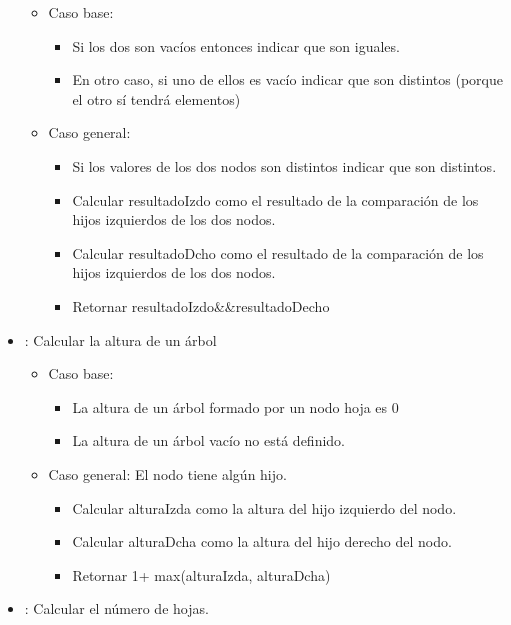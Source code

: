 \begin{itemize}
\begin{itemize}
\item Caso base: 
	\begin{itemize}
	\item Si los dos son vacíos entonces indicar que son iguales. 
	\item En otro caso, si uno de ellos es vacío indicar que son distintos (porque el otro sí tendrá elementos)
	\end{itemize}
\item Caso general: 
	\begin{itemize}
	\item Si los valores de los dos nodos son distintos indicar que son distintos.
	\item Calcular resultadoIzdo como el resultado de la comparación de los hijos izquierdos de los dos nodos.
	\item Calcular resultadoDcho como el resultado de la comparación de los hijos izquierdos de los dos nodos.
	\item Retornar resultadoIzdo\&\&resultadoDecho
	\end{itemize}
\end{itemize}


\item {}:   Calcular la altura de un árbol

\begin{itemize}
\item Caso base: 
	\begin{itemize}
	\item La altura de un árbol formado por un nodo hoja es 0
	\item La altura de un árbol vacío no está definido.
	\end{itemize}
\item Caso general: El nodo tiene algún hijo.
	\begin{itemize}
	\item Calcular alturaIzda como la altura del hijo izquierdo del nodo.
	\item Calcular alturaDcha como la altura del hijo derecho del nodo.
	\item Retornar 1+ max(alturaIzda, alturaDcha)
	\end{itemize}
\end{itemize}


\item  {}: Calcular el número de hojas.


\end{itemize}
